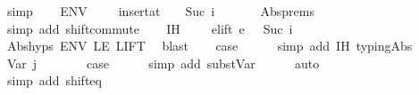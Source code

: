 \begin{isabellebody}
\ simp\isanewline
\ \ \isamarkupfalse%
\ ENV{\isacharcolon}{\kern0pt}\ {\isachardoublequoteopen}{\isasymtau}{}{\isacharprime}{\kern0pt}\ {\isacharhash}{\kern0pt}\ {\isasymGamma}{\isacharprime}{\kern0pt}\ {\isacharequal}{\kern0pt}\ insert{\isacharunderscore}{\kern0pt}at\ {\isacharparenleft}{\kern0pt}{\isasymtau}{}{\isacharprime}{\kern0pt}\ {\isacharhash}{\kern0pt}\ {\isasymGamma}{}{\isacharparenright}{\kern0pt}\ {\isacharparenleft}{\kern0pt}Suc\ i{\isacharparenright}{\kern0pt}\ {\isasymtau}{}{\isachardoublequoteclose}\isanewline
\ \ \ \ \isamarkupfalse%
\ Abs{\isachardot}{\kern0pt}prems{\isacharparenleft}{\kern0pt}{}{\isacharparenright}{\kern0pt}\ \isamarkupfalse%
\ {\isacharparenleft}{\kern0pt}simp\ add{\isacharcolon}{\kern0pt}\ shift{\isacharunderscore}{\kern0pt}commute{\isacharparenright}{\kern0pt}\isanewline
\ \ \isamarkupfalse%
\ IH{\isacharcolon}{\kern0pt}\ {\isachardoublequoteopen}{\isasymtau}{}{\isacharprime}{\kern0pt}\ {\isacharhash}{\kern0pt}\ {\isasymGamma}{}\ {\isasymturnstile}\ e{\isacharprime}{\kern0pt}{\isacharbrackleft}{\kern0pt}lift\ e{}\ {}\ {\isacharslash}{\kern0pt}\ Suc\ i{\isacharbrackright}{\kern0pt}\ {\isacharcolon}{\kern0pt}\ {\isasymtau}{}{\isacharprime}{\kern0pt}{\isachardoublequoteclose}\isanewline
\ \ \ \ \isamarkupfalse%
\ Abs{\isachardot}{\kern0pt}hyps{\isacharparenleft}{\kern0pt}{}{\isacharparenright}{\kern0pt}\ ENV\ LE\ LIFT\ \isamarkupfalse%
\ blast\isanewline
\ \ \isamarkupfalse%
\ {\isacharquery}{\kern0pt}case\isanewline
\ \ \ \ \isamarkupfalse%
\ {\isacharparenleft}{\kern0pt}simp\ add{\isacharcolon}{\kern0pt}\ IH\ typing{\isachardot}{\kern0pt}Abs{\isacharparenright}{\kern0pt}\isanewline
{}\isamarkupfalse%
\isanewline
\ \ \isamarkupfalse%
\ {\isacharparenleft}{\kern0pt}Var\ j\ {\isasymGamma}\ {\isasymtau}{\isacharparenright}{\kern0pt}\isanewline
\ \ \isamarkupfalse%
\ \isamarkupfalse%
\ {\isacharquery}{\kern0pt}case\isanewline
\ \ \ \ \isamarkupfalse%
\ {\isacharparenleft}{\kern0pt}simp\ add{\isacharcolon}{\kern0pt}\ subst{\isacharunderscore}{\kern0pt}Var{\isacharparenright}{\kern0pt}\isanewline
\ \ \ \ \isamarkupfalse%
\ auto\isanewline
\ \ \ \ \isamarkupfalse%
\ {\isacharparenleft}{\kern0pt}simp\ add{\isacharcolon}{\kern0pt}\ shift{\isacharunderscore}{\kern0pt}eq{\isacharparenright}{\kern0pt}\isanewline

\end{isabellebody}
